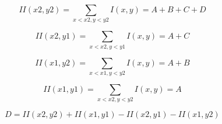 \begin{equation}
    II(x2, y2) = \sum_{x<x2, y<y2}{I(x, y)} = A + B + C + D
\end{equation}

\begin{equation}
    II(x2, y1) = \sum_{x<x2, y<y1}{I(x, y)} = A + C
\end{equation}

\begin{equation}
    II(x1, y2) = \sum_{x<x1, y<y2}{I(x, y)} = A + B
\end{equation}

\begin{equation}
    II(x1, y1) = \sum_{x<x2, y<y2}{I(x, y)} = A
\end{equation}

\begin{equation}
    D = II(x2, y2) + II(x1, y1) - II(x2, y1) - II(x1, y2)
\end{equation}

\newpage